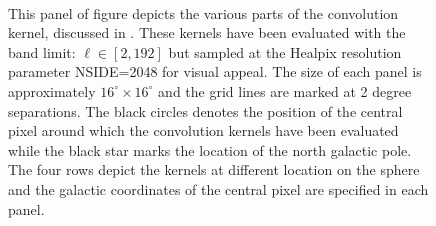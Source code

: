 \begin{figure}[t]
\hspace{-2mm}
\hspace{-2mm}
\hspace{-2mm}
\hspace{-2mm}
\hspace{-2mm}
\\[-2ex]
\hspace{-2mm}
\hspace{-2mm}
\hspace{-2mm}
\hspace{-2mm}
\hspace{-2mm}
\caption{This panel of figure depicts the various parts of the convolution kernel, discussed in . These kernels have been evaluated with the band limit: $\ell \in [2,192]$ but sampled at the Healpix resolution parameter NSIDE=2048 for visual appeal. The size of each panel is approximately $16^{\circ} \times 16^{\circ}$ and the grid lines are marked at 2 degree separations. The black circles denotes the position of the central pixel around which the convolution kernels have been evaluated while the black star marks the location of the north galactic pole. The four rows depict the kernels at different location on the sphere and the galactic coordinates of the central pixel are specified in each panel.}
\label{fig:vis_kernel}
 \end{figure}
%

